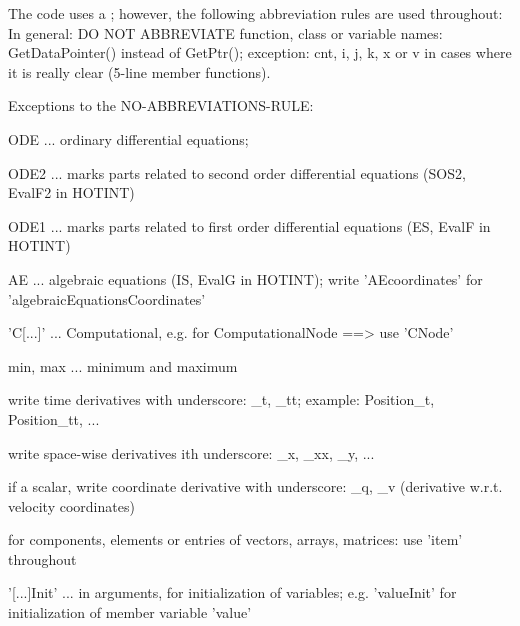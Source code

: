 %
The code uses a ; however, the following abbreviation rules are used throughout:
In general: DO NOT ABBREVIATE function, class or variable names: GetDataPointer() instead of GetPtr(); exception: cnt, i, j, k, x or v in cases where it is really clear (5-line member functions).

Exceptions to the NO-ABBREVIATIONS-RULE:
\bi
    \item ODE ... ordinary differential equations;
    \item ODE2 ... marks parts related to second order differential equations (SOS2, EvalF2 in HOTINT)
    \item ODE1 ... marks parts related to first order differential equations (ES, EvalF in HOTINT)
    \item AE ... algebraic equations (IS, EvalG in HOTINT); write 'AEcoordinates' for 'algebraicEquationsCoordinates'
    \item 'C[...]' ... Computational, e.g. for ComputationalNode ==> use 'CNode'
    \item min, max ... minimum and maximum
    \item write time derivatives with underscore: \_t, \_tt; example: Position\_t, Position\_tt, ...
    \item write space-wise derivatives ith underscore: \_x, \_xx, \_y, ...
    \item if a scalar, write coordinate derivative with underscore: \_q, \_v (derivative w.r.t. velocity coordinates)
    \item for components, elements or entries of vectors, arrays, matrices: use 'item' throughout
    \item '[...]Init' ... in arguments, for initialization of variables; e.g. 'valueInit' for initialization of member variable 'value'
\ei




